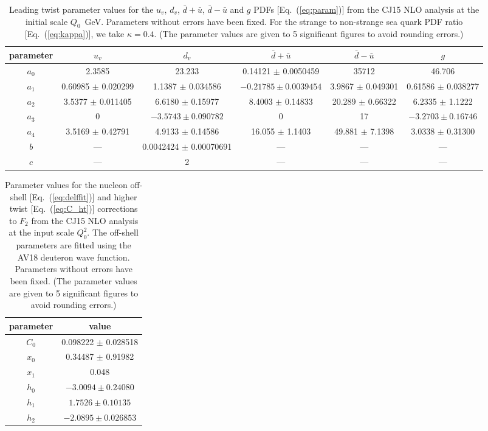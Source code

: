 \documentclass[aps,prd,amsmath,preprint]{revtex4}
\begin{document}
\begin{table}[t]
\begin{center}
\caption{Leading twist parameter values for the
	$u_v$, $d_v$, $\bar d+\bar u$, $\bar d-\bar u$ and $g$ PDFs
	[Eq.~(\ref{eq:param})] from the CJ15 NLO analysis at the
	initial scale $Q_0$~GeV.  Parameters without errors have
	been fixed.  For the strange to non-strange sea quark PDF
	ratio [Eq.~(\ref{eq:kappa})], we take $\kappa=0.4$.
	(The parameter values are given to 5 significant figures
	to avoid rounding errors.) \\}
{\scriptsize
\begin{tabular}{c|ccccc}\hline
parameter	& $u_v$
		& $d_v$
		& $\bar d+\bar u$
		& $\bar d-\bar u$
		& $g$				\\ \hline
$a_0$		& 2.3585
		& 23.233
		& 0.14121 $\pm$ 0.0050459
		& 35712
		& 46.706			\\
$a_1$		& 0.60985 $\pm$ 0.020299
		& 1.1387 $\pm$ 0.034586
		& $-0.21785 \pm 0.0039454$
		& 3.9867 $\pm$ 0.049301
		& 0.61586 $\pm$ 0.038277	\\
$a_2$		& 3.5377 $\pm$ 0.011405
		& 6.6180 $\pm$ 0.15977
		& 8.4003 $\pm$ 0.14833
		& 20.289 $\pm$ 0.66322
		& 6.2335 $\pm$ 1.1222		\\
$a_3$		& 0
		& $-3.5743 \pm 0.090782$
		& 0
		& 17
		& $-3.2703 \pm 0.16746$		\\		
$a_4$		& 3.5169 $\pm$ 0.42791
		& 4.9133 $\pm$ 0.14586
		& 16.055 $\pm$ 1.1403
		& 49.881 $\pm$ 7.1398
		& 3.0338 $\pm$ 0.31300		\\
$b$		& ---
		& 0.0042424 $\pm$ 0.00070691
		& ---
		& ---
		& ---				\\
$c$		& ---
		& 2
		& ---
		& ---
		& ---				\\ \hline
\end{tabular}
}
\label{tab:LTparams}
\end{center}
\end{table}


\begin{table}[h]
\begin{center}
\caption{Parameter values for the nucleon off-shell
	[Eq.~(\ref{eq:delffit})] and higher twist
	[Eq.~(\ref{eq:C_ht})] corrections to $F_2$ from
	the CJ15 NLO analysis at the input scale $Q_0^2$.
	The off-shell parameters are fitted using the
	AV18 deuteron wave function.
	Parameters without errors have been fixed.
	(The parameter values are given to 5 significant
	figures to avoid rounding errors.) \\}
{\scriptsize
\begin{tabular}{c|c}\hline
parameter	& value				\\ \hline
$C_0$ 		& 0.098222 $\pm$ 0.028518	\\
$x_0$ 		& 0.34487  $\pm$ 0.91982	\\
$x_1$		& 0.048				\\ \hline
%
$h_0$		& $-3.0094 \pm 0.24080$		\\    
$h_1$ 		& $ 1.7526 \pm 0.10135$         \\       
$h_2$ 		& $-2.0895 \pm 0.026853$        \\ \hline
\end{tabular}
}
\label{tab:other_params}
\end{center}
\end{table}
\end{document}
